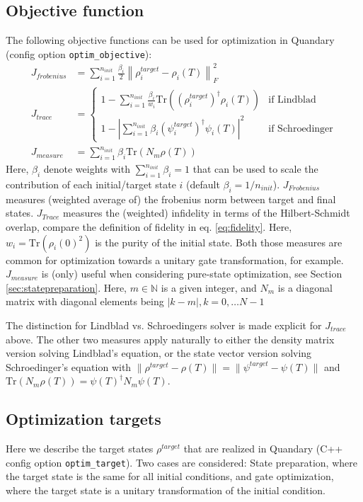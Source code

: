 \documentclass[11pt]{article}
\newcommand{\N}{\mathds{N}}
\begin{document}
\subsection{Objective function}\label{sec:objectivefunctionals}
The following objective functions can be used for optimization in Quandary (config option \texttt{optim\_objective}):
\begin{align}
 J_{frobenius} &= \sum_{i=1}^{n_{init}} \frac{\beta_i}{2} \left\| \rho^{target}_i - \rho_i(T)\right\|^2_F \\ 
 J_{trace} &= 
\begin{cases} 
 1 - \sum_{i=1}^{n_{init}} \frac{\beta_i}{w_i} \mbox{Tr}\left((\rho^{target}_i)^\dagger\rho_i(T)\right) & \text{if Lindblad}\\
 1 - \left|\sum_{i=1}^{n_{init}} \beta_i (\psi^{target}_i)^\dagger\psi_i(T)\right|^2 & \text{if Schroedinger}
\end{cases}\\
 J_{measure} &= \sum_{i=1}^{n_{init}} \beta_i \mbox{Tr} \left( N_m \rho(T) \right) \label{eq:Jmeasure} 
\end{align}
Here, $\beta_i$ denote weights with $\sum_{i=1}^{n_{init}} \beta _i = 1$ that can be used to scale the contribution of each initial/target state $i$ (default $\beta_i = 1/n_{init}$). 
$J_{Frobenius}$ measures (weighted average of) the frobenius norm between target and final states. $J_{Trace}$ measures the (weighted) infidelity in terms of the Hilbert-Schmidt overlap, compare the definition of fidelity in eq. \eqref{eq:fidelity}. Here, $w_i = \mbox{Tr}\left(\rho_i(0)^2\right)$ is the purity of the initial state. Both those measures are common for optimization towards a unitary gate transformation, for example. $J_{measure}$ is (only) useful when considering pure-state optimization, see Section \ref{sec:statepreparation}. Here, $m\in\N$ is a given integer, and $N_m$ is a diagonal matrix with diagonal elements being $|k-m|, k=0,\dots N-1$ 

The distinction for Lindblad vs. Schroedingers solver is made explicit for $J_{trace}$ above. The other two measures apply naturally to either the density matrix version solving Lindblad's equation, or the state vector version solving Schroedinger's equation with $ \|\rho^{target} - \rho(T)\| = \|\psi^{target} - \psi(T)\|$ and $\mbox{Tr}\left(N_m\rho(T)\right) = \psi(T)^\dagger N_m \psi(T)$. 



\subsection{Optimization targets} \label{sec:targets}
Here we describe the target states $\rho^{target}$ that are realized in Quandary (C++ config option \texttt{optim\_target}). Two cases are considered: State preparation, where the target state is the same for all initial conditions, and gate optimization, where the target state is a unitary transformation of the initial condition. 
\end{document}
